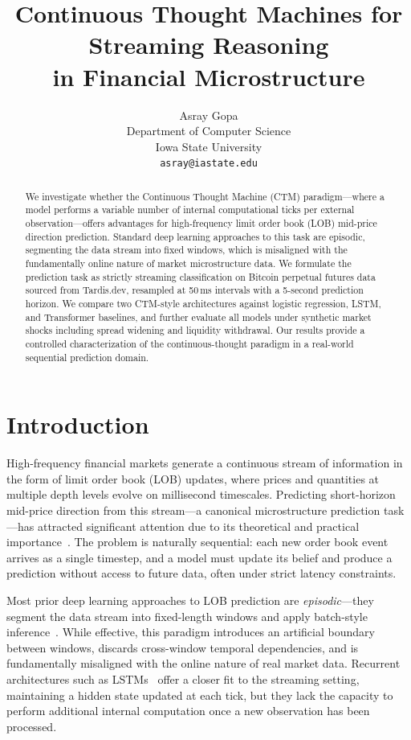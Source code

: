 \documentclass[11pt]{article}
\title{Continuous Thought Machines for Streaming Reasoning\\in Financial Microstructure}
\author{Asray Gopa\\
  Department of Computer Science\\
  Iowa State University\\
  \texttt{asray@iastate.edu}}
\date{}
\begin{document}
\maketitle

\begin{abstract}
We investigate whether the Continuous Thought Machine (CTM) paradigm---where a
model performs a variable number of internal computational ticks per external
observation---offers advantages for high-frequency limit order book (LOB)
mid-price direction prediction. Standard deep learning approaches to this task
are episodic, segmenting the data stream into fixed windows, which is
misaligned with the fundamentally online nature of market microstructure data.
We formulate the prediction task as strictly streaming classification on
Bitcoin perpetual futures data sourced from Tardis.dev, resampled at 50\,ms
intervals with a 5-second prediction horizon. We compare two CTM-style
architectures against logistic regression, LSTM, and Transformer baselines,
and further evaluate all models under synthetic market shocks including spread
widening and liquidity withdrawal. Our results provide a controlled
characterization of the continuous-thought paradigm in a real-world sequential
prediction domain.
\end{abstract}

\section{Introduction}

High-frequency financial markets generate a continuous stream of information
in the form of limit order book (LOB) updates, where prices and quantities at
multiple depth levels evolve on millisecond timescales. Predicting short-horizon
mid-price direction from this stream---a canonical microstructure prediction
task---has attracted significant attention due to its theoretical and practical
importance~\citep{gould2013limit, cont2010stochastic}. The problem is naturally
sequential: each new order book event arrives as a single timestep, and a model
must update its belief and produce a prediction without access to future data,
often under strict latency constraints.

Most prior deep learning approaches to LOB prediction are \emph{episodic}---they
segment the data stream into fixed-length windows and apply batch-style
inference~\citep{zhang2019deeplob, wallbridge2020transformers}. While effective,
this paradigm introduces an artificial boundary between windows, discards
cross-window temporal dependencies, and is fundamentally misaligned with the
online nature of real market data. Recurrent architectures such as
LSTMs~\citep{hochreiter1997long} offer a closer fit to the streaming setting,
maintaining a hidden state updated at each tick, but they lack the capacity to
perform additional internal computation once a new observation has been
processed.
\end{document}
